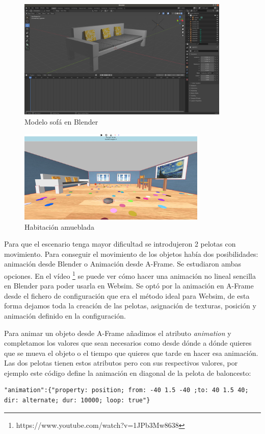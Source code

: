 \begin{figure}[H]
  \centering
 \includegraphics[width=0.9\textwidth, height=0.5\textwidth]{chapters/images/sofa.png}
  \caption{Modelo sofá en Blender}
\end{figure}



\begin{figure}[H]
\centering
\includegraphics[width=0.8\textwidth, height=0.4\textwidth]{chapters/images/habitacioncon.png}
\caption{Habitación amueblada}
\end{figure}

Para que el escenario tenga mayor dificultad se introdujeron 2 pelotas con movimiento. Para conseguir el movimiento de los objetos había dos posibilidades: animación desde Blender o Animación desde A-Frame. 
Se estudiaron ambas opciones. En el vídeo \footnote{https://www.youtube.com/watch?v=1JPb3Mw8638}  se puede ver cómo hacer una animación no lineal sencilla en Blender para poder usarla en Websim. Se optó por la animación en A-Frame desde el fichero de configuración que era el método ideal para Websim, de esta forma dejamos toda la creación de las pelotas, asignación de texturas, posición y  animación definido en la configuración.

Para animar un objeto desde A-Frame añadimos el atributo \textit{animation} y completamos los valores que sean necesarios como desde dónde a dónde quieres que se mueva  el objeto o el tiempo que quieres que tarde en hacer esa animación. Las dos pelotas tienen estos atributos pero con sus respectivos valores, por ejemplo este código define la animación en diagonal de la pelota de baloncesto: 
\begin{lstlisting}
"animation":{"property: position; from: -40 1.5 -40 ;to: 40 1.5 40; dir: alternate; dur: 10000; loop: true"}
\end{lstlisting}

